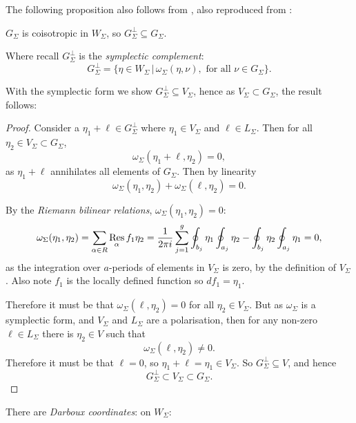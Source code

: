         The following proposition also follows from \cite{ks_airy}, also reproduced from \cite{chaimanowong2020airy}: 
        \begin{prop} \(G_\Sigma\) is coisotropic in \(W_\Sigma\), so \(G^{\perp}_\Sigma \subseteq G_\Sigma \).
        \end{prop}
        Where recall \(G_\Sigma^{\perp}\) is the \emph{symplectic complement}: 
        \[ G_\Sigma^{\perp} = \{ \eta \in W_\Sigma \, | \,\omega_\Sigma(\eta,\nu), \text{ for all } \nu \in G_\Sigma \}.\]

        With the symplectic form we show \(G_\Sigma^{\perp} \subseteq V_\Sigma\), hence as \(V_\Sigma \subset G_\Sigma\), the result follows:
        \begin{proof}
        Consider a \(\eta_1+\ell \in G_\Sigma^\perp \) where \(\eta_1 \in V_\Sigma \) and \(\ell \in  L_\Sigma\).  
        Then for all \(\eta_2 \in V_\Sigma \subset G_\Sigma \),
        \[ \omega_\Sigma(\eta_1+\ell,\eta_2)=0,\] 
        as \( \eta_1+\ell\) annihilates all elements of \(G_\Sigma\). Then by linearity 
        \[ \omega_\Sigma(\eta_1, \eta_2) + \omega_\Sigma(\ell, \eta_2) =0.\]
        
        By the \emph{Riemann bilinear relations}, \(\omega_\Sigma(\eta_1,\eta_2)=0\): 
        \begin{equation}  
        \label{eqn:RiemBilRel}
        \omega_\Sigma( \eta_1, \eta_2) = \sum_{\alpha \in R}\operatorname*{Res}_{\alpha} f_1\eta_2 = \frac{1}{2\pi i}\sum_{j=1}^g\oint_{b_j}\eta_1\oint_{a_j}\eta_2-\oint_{b_j}\eta_2\oint_{a_j}\eta_1=0,
        \end{equation}
        as the integration over \(a\)-periods of elements in \(V_\Sigma\) is zero, by the definition of \(V_\Sigma\).
        Also note \(f_1\) is the locally defined function so \(df_1=\eta_1\).
        
        Therefore it must be that \(\omega_\Sigma(\ell,\eta_2)=0\) for all \(\eta_2\in V_\Sigma\). But as  \(\omega_\Sigma\) is a symplectic form, and \(V_\Sigma\) and \(L_\Sigma\) are a polarisation, then for any non-zero \(\ell\in L_\Sigma\) there is \(\eta_2\in V\) such that \[\omega_\Sigma(\ell,\eta_2)\neq 0.\] Therefore it must be that \(\ell=0\), so \(\eta_1+\ell=\eta_1\in V_\Sigma \). So \( G_\Sigma^{\perp} \subseteq V\), and hence
        \[G_\Sigma^\perp\subset V_\Sigma \subset G_\Sigma.\]
        \end{proof}
        
        
        There are \emph{Darboux coordinates}: on \(W_\Sigma\):
        
